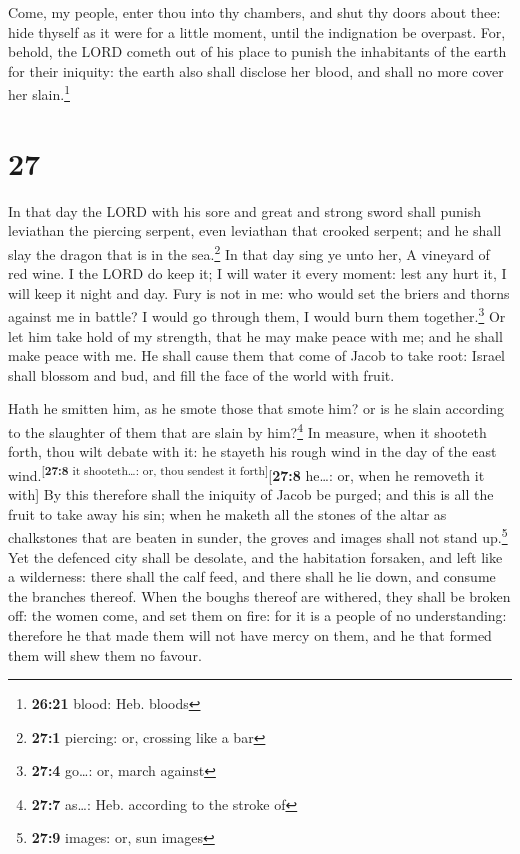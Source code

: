  Come, my people, enter thou into thy chambers, and shut
thy doors about thee: hide thyself as it were for a little moment, until
the indignation be overpast.  For, behold, the LORD
cometh out of his place to punish the inhabitants of the earth for their
iniquity: the earth also shall disclose her blood, and shall no more
cover her slain.\footnote{\textbf{26:21} blood: Heb. bloods}

\hypertarget{section-26}{%
\section{27}\label{section-26}}

 In that day the LORD with his sore and great and strong
sword shall punish leviathan the piercing serpent, even leviathan that
crooked serpent; and he shall slay the dragon that is in the
sea.\footnote{\textbf{27:1} piercing: or, crossing like a bar}
 In that day sing ye unto her, A vineyard of red wine.
 I the LORD do keep it; I will water it every moment: lest
any hurt it, I will keep it night and day.  Fury is not in
me: who would set the briers and thorns against me in battle? I would go
through them, I would burn them together.\footnote{\textbf{27:4}
  go\ldots: or, march against}  Or let him take hold of my
strength, that he may make peace with me; and he shall make peace with
me.  He shall cause them that come of Jacob to take root:
Israel shall blossom and bud, and fill the face of the world with fruit.

 Hath he smitten him, as he smote those that smote him? or
is he slain according to the slaughter of them that are slain by
him?\footnote{\textbf{27:7} as\ldots: Heb. according to the stroke of}
 In measure, when it shooteth forth, thou wilt debate with
it: he stayeth his rough wind in the day of the east
wind.\textsuperscript{{[}\textbf{27:8} it shooteth\ldots: or, thou
sendest it forth{]}}{[}\textbf{27:8} he\ldots: or, when he removeth it
with{]}  By this therefore shall the iniquity of Jacob be
purged; and this is all the fruit to take away his sin; when he maketh
all the stones of the altar as chalkstones that are beaten in sunder,
the groves and images shall not stand up.\footnote{\textbf{27:9} images:
  or, sun images}  Yet the defenced city shall be
desolate, and the habitation forsaken, and left like a wilderness: there
shall the calf feed, and there shall he lie down, and consume the
branches thereof.  When the boughs thereof are withered,
they shall be broken off: the women come, and set them on fire: for it
is a people of no understanding: therefore he that made them will not
have mercy on them, and he that formed them will shew them no favour.

